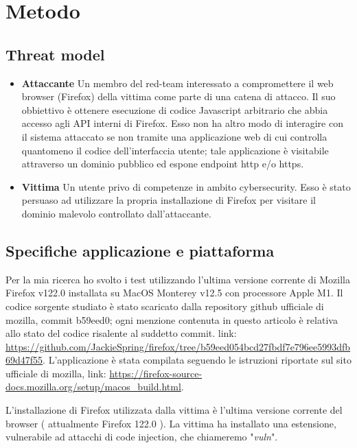 \documentclass[]{./sapthesis/sapthesis}
\begin{document}
\newpage
\chapter{Metodo}
    \section{Threat model}
        \begin{itemize}
            \item \textbf{Attaccante} Un membro del red-team interessato a compromettere
                il web browser (Firefox) della vittima come parte di una catena di attacco.
                Il suo obbiettivo è ottenere esecuzione di codice Javascript arbitrario che abbia
                accesso agli API interni di Firefox.
                Esso non ha altro modo di interagire con il sistema attaccato se non tramite
                una applicazione web di cui controlla quantomeno il codice dell'interfaccia utente;
                tale applicazione è visitabile attraverso un dominio pubblico ed espone endpoint
                http e/o https.

            \item \textbf{Vittima} Un utente privo di competenze in ambito cybersecurity.
                Esso è stato persuaso ad utilizzare la propria installazione di Firefox
                per visitare il dominio malevolo controllato dall'attaccante.
        \end{itemize}

    \section{Specifiche applicazione e piattaforma}
        Per la mia ricerca ho svolto i test utilizzando l'ultima versione corrente di
        Mozilla Firefox v122.0 installata su MacOS Monterey v12.5 con processore Apple M1.
        Il codice sorgente studiato è stato scaricato dalla repository github ufficiale di mozilla,
        commit b59eed0; ogni menzione contenuta in questo articolo è relativa allo stato del codice
        risalente al suddetto commit. link: \url{https://github.com/JackieSpring/firefox/tree/b59eed054bcd27fbdf7e796ee5993dfb69d47f55}. 
        L'applicazione è stata compilata seguendo le istruzioni riportate sul sito
        ufficiale di mozilla, link: \url{https://firefox-source-docs.mozilla.org/setup/macos_build.html}.

        L'installazione di Firefox utilizzata dalla vittima è l'ultima versione corrente
        del browser ( attualmente Firefox 122.0 ). La vittima ha installato una estensione,
        vulnerabile ad attacchi di code injection, che chiameremo "\textit{vuln}".
\end{document}
